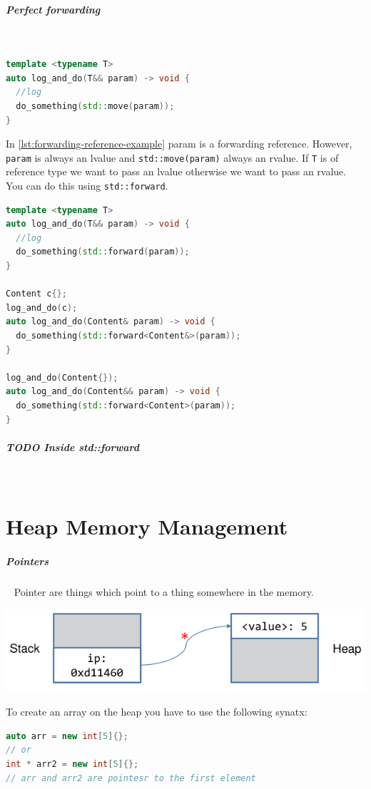 \documentclass[11pt,twoside,landscape]{article}
\begin{document}
\begin{multicols}{2}
\subparagraph{Perfect forwarding} \
\label{sec:orgaf5ae35}
\begin{lstlisting}[language=c++,label=lst:forwarding-reference-example,caption={Forwarding Reference example},captionpos=b,numbers=none]
template <typename T>
auto log_and_do(T&& param) -> void {
  //log
  do_something(std::move(param));
}
\end{lstlisting}

In \autoref{lst:forwarding-reference-example} param is a forwarding reference.
However, \texttt{param} is always an lvalue and \texttt{std::move(param)} always an rvalue.
If \texttt{T} is of reference type we want to pass an lvalue otherwise we want to pass an rvalue.
You can do this using \texttt{std::forward}.

\begin{lstlisting}[language=c++,label=lst:forwarding-reference-using-std-forward-example,caption={Forwarding Reference using std::forward example},captionpos=b,numbers=none]
template <typename T>
auto log_and_do(T&& param) -> void {
  //log
  do_something(std::forward(param));
}

Content c{};
log_and_do(c);
auto log_and_do(Content& param) -> void {
  do_something(std::forward<Content&>(param));
}

log_and_do(Content{});
auto log_and_do(Content&& param) -> void {
  do_something(std::forward<Content>(param));
}
\end{lstlisting}
\subparagraph{{\bfseries\sffamily TODO} Inside std::forward} \
\label{sec:org413fc6f}

\section{Heap Memory Management}
\label{sec:orgcff8a70}
\subparagraph{Pointers} \
\label{sec:orgc4f2c71}
Pointer are things which point to a thing somewhere in the memory.


{
\begin{center}
\includegraphics[width=.9\linewidth]{img/pointer_to_heap.png}
\end{center}
\label{fig:point-from-stack-to-heap}
}
To create an array on the heap you have to use the following synatx:
\begin{lstlisting}[language=c++,numbers=none]
auto arr = new int[5]{};
// or
int * arr2 = new int[5]{};
// arr and arr2 are pointesr to the first element
\end{lstlisting}


\end{multicols}
\end{document}
